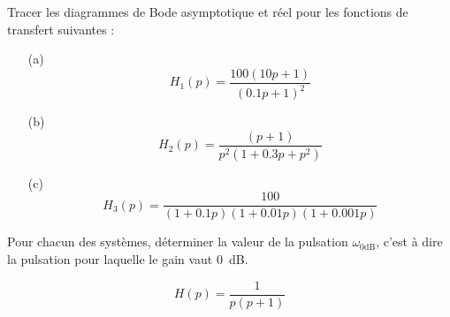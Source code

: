 \question{}
Tracer les diagrammes de Bode asymptotique et réel pour les fonctions de 
transfert suivantes :
\begin{itemize}
    \item[(a)]
\[
    H_1(p)=\dfrac{100(10p+1)}{(0.1p+1)^2}
\]
    \item[(b)]
\[
    H_2(p)=\dfrac{(p+1)}{p^2(1+0.3p+p^2)} 
\]
    \item[(c)]
\[
    H_3(p)=\dfrac{100}{(1+0.1p)(1+0.01p)(1+0.001p)}
\]
\end{itemize}
\question{}
Pour chacun des systèmes, déterminer la valeur de la pulsation 
$\omega_{0\si{\dB}}$, c'est à dire la pulsation pour laquelle le gain 
vaut 0~\si{\dB}.


\[
    H(p)=\dfrac{1}{p(p+1)               }
\]

